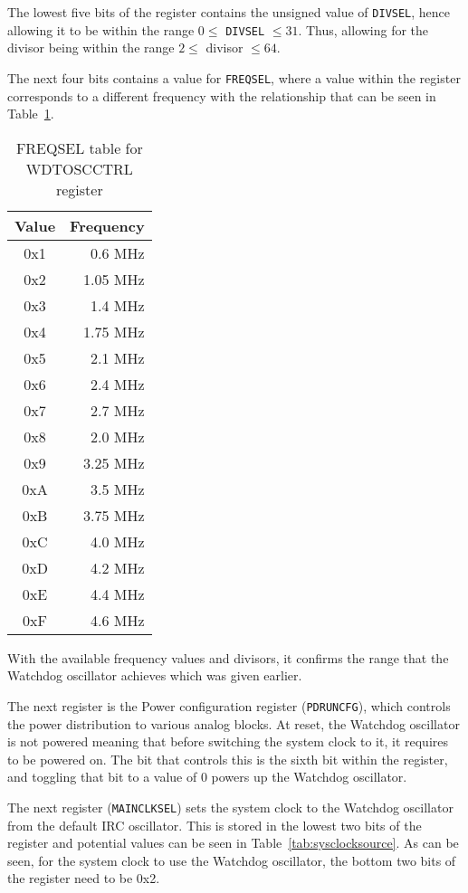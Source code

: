 The lowest five bits of the register contains the unsigned value of \verb|DIVSEL|, hence allowing it to be within the range $ 0 \leq $ \verb|DIVSEL| $ \leq 31$. Thus, allowing for the divisor being within the range $ 2 \leq $ divisor $ \leq 64$.

The next four bits contains a value for \verb|FREQSEL|, where a value within the register corresponds to a different frequency with the relationship that can be seen in Table~\ref{tab:freqsel}.

\begin{table}
	\centering
	\begin{tabular}{|c|r|}
		\hline
		Value & Frequency \\
		\hline
		0x1 & 0.6 MHz \\
		0x2 & 1.05 MHz \\
		0x3 & 1.4 MHz \\
		0x4 & 1.75 MHz \\
		0x5 & 2.1 MHz \\
		0x6 & 2.4 MHz \\
		0x7 & 2.7 MHz \\
		0x8 & 2.0 MHz \\
		0x9 & 3.25 MHz \\
		0xA & 3.5 MHz \\
		0xB & 3.75 MHz \\
		0xC & 4.0 MHz \\
		0xD & 4.2 MHz \\
		0xE & 4.4 MHz \\
		0xF & 4.6 MHz \\
		\hline
	\end{tabular}
	\caption{FREQSEL table for WDTOSCCTRL register}
	\label{tab:freqsel}
\end{table}

With the available frequency values and divisors, it confirms the range that the Watchdog oscillator achieves which was given earlier.

The next register is the Power configuration register (\verb|PDRUNCFG|), which controls the power distribution to various analog blocks. At reset, the Watchdog oscillator is not powered meaning that before switching the system clock to it, it requires to be powered on. The bit that controls this is the sixth bit within the register, and toggling that bit to a value of 0 powers up the Watchdog oscillator. 

The next register (\verb|MAINCLKSEL|) sets the system clock to the Watchdog oscillator from the default IRC oscillator. This is stored in the lowest two bits of the register and potential values can be seen in Table~\ref{tab:sysclocksource}. As can be seen, for the system clock to use the Watchdog oscillator, the bottom two bits of the register need to be 0x2.

